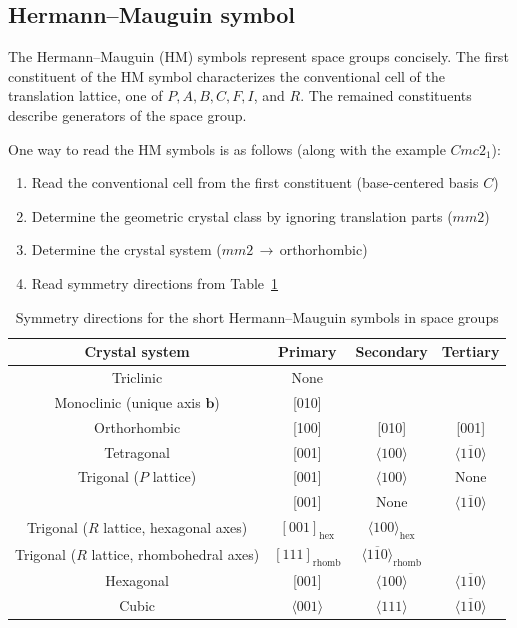 \subsection{Hermann--Mauguin symbol}

The Hermann--Mauguin (HM) symbols represent space groups concisely.
The first constituent of the HM symbol characterizes the conventional cell of the translation lattice, one of $P, A, B, C, F, I$, and $R$.
The remained constituents describe generators of the space group.

One way to read the HM symbols is as follows (along with the example $Cmc2_{1}$):
\begin{enumerate}
  \item Read the conventional cell from the first constituent (base-centered basis $C$)
  \item Determine the geometric crystal class by ignoring translation parts ($mm2$)
  \item Determine the crystal system ($mm2 \, \rightarrow \, \mbox{orthorhombic}$)
  \item Read symmetry directions from Table~\ref{tab:hermann-mauguin}
\end{enumerate}

\begin{table}[htb]
  \caption{Symmetry directions for the short Hermann--Mauguin symbols in space groups}
  \label{tab:hermann-mauguin}
  \centering
  \begin{tabular}{cccc}
    \hline\hline
    Crystal system & Primary & Secondary & Tertiary  \\ \hline
    Triclinic                         & None  & & \\
    Monoclinic (unique axis $\bm{b}$) & [010] & & \\
    Orthorhombic                      & [100] & [010] & [001] \\
    Tetragonal                        & [001] & $\langle 100 \rangle$ & $\langle 1\overline{1}0 \rangle $ \\
    Trigonal ($P$ lattice) & [001] & $\langle 100 \rangle$ & None \\
                           & [001] & None & $\langle 1\overline{1}0 \rangle $ \\
    Trigonal ($R$ lattice, hexagonal axes) &
      $[001]_{\mathrm{hex}}$ & $\langle 100 \rangle_{\mathrm{hex}}$ & \\
    Trigonal ($R$ lattice, rhombohedral axes) &
      $[111]_{\mathrm{rhomb}}$ & $\langle 1\overline{1}0 \rangle_{\mathrm{rhomb}}$ & \\
    Hexagonal                        & [001] & $\langle 100 \rangle$ & $\langle 1\overline{1}0 \rangle$ \\
    Cubic                            & $\langle 001 \rangle$ & $\langle 111 \rangle$ & $\langle 1\overline{1}0 \rangle$ \\
    \hline\hline
  \end{tabular}
\end{table}

